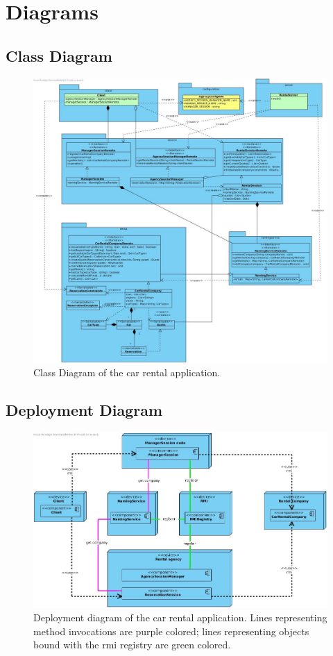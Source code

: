 \newpage
\section{Diagrams}
\subsection{Class Diagram}
\begin{figure}[h]
	\centerline{\includegraphics[scale=0.4]{images/classDiagram}}
	\caption{Class Diagram of the car rental application.}
\end{figure}

\newpage
\subsection{Deployment Diagram}
\begin{figure}[h!]
	\centerline{\includegraphics[scale=0.58]{images/deploymentDiagram}}
	\caption{Deployment diagram of the car rental application. Lines representing method invocations are purple colored; lines representing objects bound with the rmi registry are green colored.}
\end{figure}

